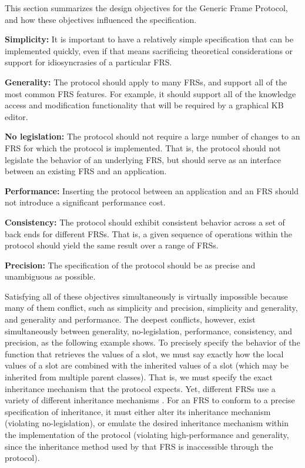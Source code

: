 This section summarizes the design objectives for the
Generic Frame Protocol, and how these objectives influenced the
specification.

{\bf Simplicity:}  It is important to have
a relatively simple specification that can be implemented quickly,
even if that means sacrificing theoretical considerations or support
for idiosyncrasies of a particular FRS.

{\bf Generality:}  The protocol should  apply to many
FRSs, and support all of the most common FRS features.  For
example, it should support all of the knowledge access and
modification functionality that will be required by a graphical KB
editor.  

{\bf No legislation:}  The
protocol should not require a large number of changes to an FRS for
which the protocol is implemented.  That is, the protocol should not
legislate the behavior of an underlying FRS, but should serve as an
interface between an existing FRS and an application.

{\bf Performance:}  Inserting the protocol between an application and
an FRS should not introduce a significant performance cost. 

{\bf Consistency:}  The protocol should exhibit consistent behavior 
across a set of back ends for different FRSs.  That is, a given 
sequence of operations within the protocol should yield the same
result over a range of FRSs.

{\bf Precision:}  The specification of the protocol should be as
precise and unambiguous as possible.

Satisfying all of these objectives simultaneously is virtually
impossible because many of them conflict, such as simplicity and
precision, simplicity and generality, and generality and performance.
The deepest conflicts, however, exist simultaneously between
generality, no-legislation, performance, consistency, and precision,
as the following example shows.  To precisely specify the behavior of
the function that retrieves the values of a slot, we must say exactly
how the local values of a slot are combined with the inherited values
of a slot (which may be inherited from multiple parent classes).  That is, we
must specify the exact inheritance mechanism that the protocol
expects.  Yet, different FRSs use a variety of different inheritance
mechanisms \cite{KarpFreview}.  For an FRS to conform to a precise
specification of inheritance, it must either alter its inheritance
mechanism (violating no-legislation), or emulate the desired
inheritance mechanism within the implementation of the protocol
(violating high-performance and generality, since the inheritance
method used by that FRS is inaccessible through the protocol).

